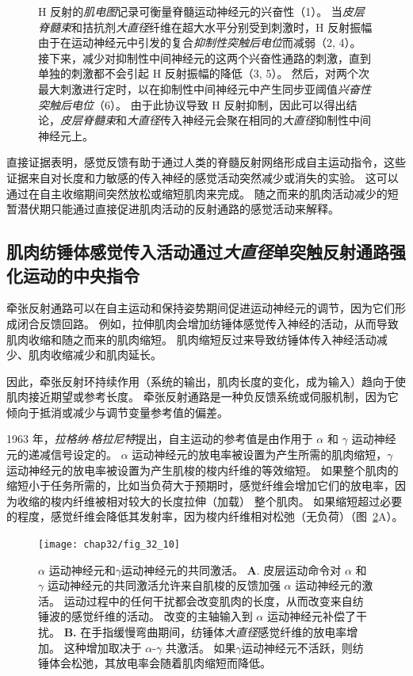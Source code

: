 \begin{figure}[htbp]
{	H 反射的\textit{肌电图}记录可衡量脊髓运动神经元的兴奋性（1）。
	当\textit{皮层脊髓束}和拮抗剂\textit{大直径}纤维在超大水平分别受到刺激时，H 反射振幅由于在运动神经元中引发的复合\textit{抑制性突触后电位}而减弱（2, 4）。
	接下来，减少对抑制性中间神经元的这两个兴奋性通路的刺激，直到单独的刺激都不会引起 H 反射振幅的降低（3, 5）。
	然后，对两个次最大刺激进行定时，以在抑制性中间神经元中产生同步亚阈值\textit{兴奋性突触后电位}（6）。
	由于此协议导致 H 反射抑制，因此可以得出结论，\textit{皮层脊髓束}和\textit{大直径}传入神经元会聚在相同的\textit{大直径}抑制性中间神经元上。}
	\label{fig:32_9}
\end{figure}


直接证据表明，感觉反馈有助于通过人类的脊髓反射网络形成自主运动指令，这些证据来自对长度和力敏感的传入神经的感觉活动突然减少或消失的实验。
这可以通过在自主收缩期间突然放松或缩短肌肉来完成。
随之而来的肌肉活动减少的短暂潜伏期只能通过直接促进肌肉活动的反射通路的感觉活动来解释。



\subsection{肌肉纺锤体感觉传入活动通过\textit{大直径}单突触反射通路强化运动的中央指令}

牵张反射通路可以在自主运动和保持姿势期间促进运动神经元的调节，因为它们形成闭合反馈回路。
例如，拉伸肌肉会增加纺锤体感觉传入神经的活动，从而导致肌肉收缩和随之而来的肌肉缩短。
肌肉缩短反过来导致纺锤体传入神经活动减少、肌肉收缩减少和肌肉延长。


因此，牵张反射环持续作用（系统的输出，肌肉长度的变化，成为输入）趋向于使肌肉接近期望或参考长度。
牵张反射通路是一种负反馈系统或伺服机制，因为它倾向于抵消或减少与调节变量参考值的偏差。


1963 年，\textit{拉格纳$\cdot$格拉尼特}提出，自主运动的参考值是由作用于 $ \alpha $ 和 $ \gamma $ 运动神经元的递减信号设定的。
$ \alpha $ 运动神经元的放电率被设置为产生所需的肌肉缩短，$ \gamma $ 运动神经元的放电率被设置为产生肌梭的梭内纤维的等效缩短。
如果整个肌肉的缩短小于任务所需的，比如当负荷大于预期时，感觉纤维会增加它们的放电率，因为收缩的梭内纤维被相对较大的长度拉伸（加载） 整个肌肉。
如果缩短超过必要的程度，感觉纤维会降低其发射率，因为梭内纤维相对松弛（无负荷）（图~\ref{fig:32_10}A）。


\begin{figure}[htbp]
	\centering
	\texttt{[image: chap32/fig\_32\_10]}
	\caption{$ \alpha $ 运动神经元和$ \gamma $运动神经元的共同激活。
	\textbf{A}. 皮层运动命令对 $ \alpha $ 和 $ \gamma $ 运动神经元的共同激活允许来自肌梭的反馈加强 $ \alpha $ 运动神经元的激活。
	运动过程中的任何干扰都会改变肌肉的长度，从而改变来自纺锤波的感觉纤维的活动。
	改变的主轴输入到 $ \alpha $ 运动神经元补偿了干扰。
	\textbf{B.} 在手指缓慢弯曲期间，纺锤体\textit{大直径}感觉纤维的放电率增加。
	这种增加取决于 $ \alpha $-$ \gamma $ 共激活。
	如果$ \gamma $运动神经元不活跃，则纺锤体会松弛，其放电率会随着肌肉缩短而降低\cite{vallbo1981basic}。}
	\label{fig:32_10}
\end{figure}


